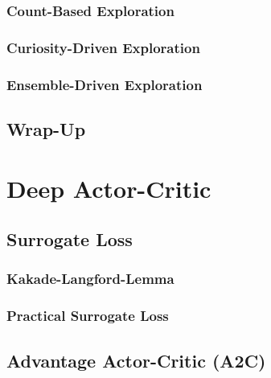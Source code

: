         \subsection{Count-Based Exploration} %

        \subsection{Curiosity-Driven Exploration} %

        \subsection{Ensemble-Driven Exploration} %

    \section{Wrap-Up} %

\chapter{Deep Actor-Critic} %

    \section{Surrogate Loss} %

        \subsection{Kakade-Langford-Lemma} %

        \subsection{Practical Surrogate Loss} %

    \section{Advantage Actor-Critic (A2C)} %

